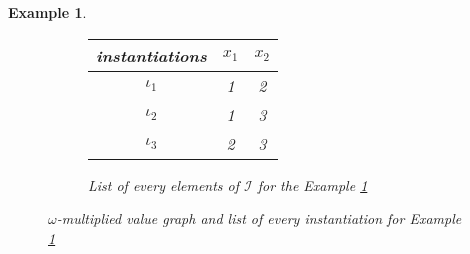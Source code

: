 \documentclass[jair,twoside,11pt,theapa]{article}
\newtheorem{example}[theorem]{Example}
\begin{document}
\begin{example}
\begin{figure}
\begin{subfigure}{0.3\textwidth}
		\begin{tabular}{ccc}
		instantiations & $x_1$ & $x_2$ \\
		\hline
		$\iota_1$ & 1 & 2 \\
		$\iota_2$ & 1 & 3 \\
		$\iota_3$ & 2 & 3 \\
		\end{tabular}
        \vspace{0.6cm}
		\caption{List of every elements of $\mathcal{I}$ for the Example \ref{exampleModelRefined}}
		\label{listInstantiations}
    \end{subfigure}
    \caption{$\omega$-multiplied value graph and list of every instantiation for Example \ref{exampleModelRefined}}
\end{figure}
\label{exampleModelRefined}
\end{example}
\end{document}
